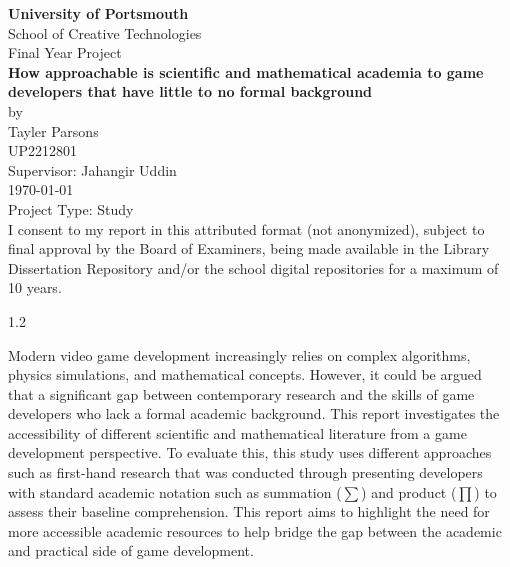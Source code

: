 \documentclass[12pt,a4paper]{report}
\begin{document}

\begin{titlepage}
  \begin{center}
        {\bfseries\LARGE University of Portsmouth}\\[1em]
        {\Large School of Creative Technologies}\\[4em]

        {\large Final Year Project}\\[1em]
        
        {\Large\bfseries
            How approachable is scientific and mathematical academia to game developers that have little to no formal background
        }\\[2em]

        {\Large by}\\[1.0em]
        {\Large Tayler Parsons}\\
        {\Large UP2212801}\\[2em]

        Supervisor: Jahangir Uddin\\[1em]
        \today\\[2em]

        Project Type: Study\\[1em]

        I consent to my report in this attributed format (not anonymized), subject to final approval by the Board of Examiners, 
        being made available in the Library Dissertation Repository and/or the school digital repositories for a maximum of 10 years.

        \vspace{1em}
         \hspace{0.25em} 
    \end{center}

    \vfill

    \setlength{\headheight}{14.5pt}
    \begin{spacing}{1.2}

    Modern video game development increasingly relies on complex algorithms, physics simulations, and mathematical concepts. However, it could be argued
    that a significant gap between contemporary research and the skills of game developers who lack a formal academic background.
    This report investigates the accessibility of different scientific and mathematical literature from a game development perspective.
    To evaluate this, this study uses different approaches such as first-hand research that was conducted through presenting developers with 
    standard academic notation such as summation ($\sum$) and product ($\prod$) to assess their baseline comprehension.
    This report aims to highlight the need for more accessible academic resources to help bridge the gap between the academic and practical side of game development.

    \end{spacing}
\end{titlepage}
\end{document}
